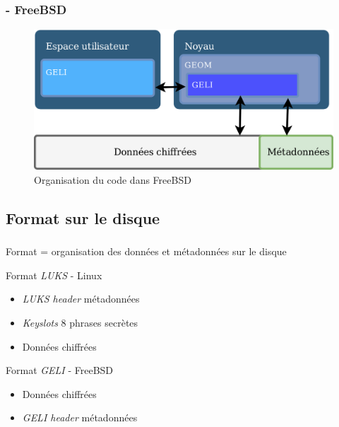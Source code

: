 \begin{frame}
  \frametitle{\insertsubsectionhead - \textbf{FreeBSD}}
  \begin{figure}
    \includegraphics[width=\textwidth]{etat_art/organisation_freebsd}
    \caption{Organisation du code dans FreeBSD}
  \end{figure}
\end{frame}

\subsection{Format sur le disque}

\begin{frame}
  \frametitle{\insertsubsectionhead}
  \pause
  \begin{center}
    Format = organisation des données et métadonnées sur le disque
  \end{center}
  \pause
  \begin{block}{Format \textit{LUKS} - Linux}
    \begin{itemize}
    \item \textit{LUKS header} \textrightarrow{} métadonnées
    \item \textit{Keyslots} \textrightarrow{} 8 phrases secrètes
    \item Données chiffrées
    \end{itemize}
  \end{block}
  \pause
  \begin{block}{Format \textit{GELI} - FreeBSD}
    \begin{itemize}
    \item Données chiffrées
    \item \textit{GELI header} \textrightarrow{} métadonnées
    \end{itemize}
  \end{block}
\end{frame}

